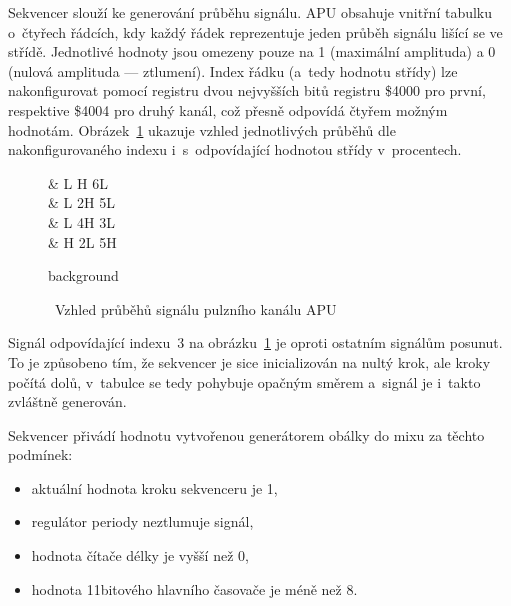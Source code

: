 Sekvencer slouží ke generování průběhu signálu. APU obsahuje vnitřní tabulku o~čtyřech řádcích, kdy každý řádek reprezentuje jeden průběh signálu lišící se ve střídě. Jednotlivé hodnoty jsou omezeny pouze na 1 (maximální amplituda) a 0 (nulová amplituda --- ztlumení). Index řádku (a~tedy hodnotu střídy) lze nakonfigurovat pomocí registru dvou nejvyšších bitů registru \$4000 pro první, respektive \$4004 pro druhý kanál, což přesně odpovídá čtyřem možným hodnotám. Obrázek~\ref{fig:apu-signaly} ukazuje vzhled jednotlivých průběhů dle nakonfigurovaného indexu i~s~odpovídající hodnotou střídy v~procentech.~\cite{Nesdev:apu-pulse}

\begin{figure}[ht!]
	\centering
	\caption{~Vzhled průběhů signálu pulzního kanálu APU}\label{fig:apu-signaly}
	\begin{tikztimingtable}[%
		timing/dslope=0.1,
		timing/.style={x=5ex,y=3ex},
		x=5ex,
		timing/rowdist=4ex,
		timing/name/.style={font=\sffamily\scriptsize}
		]
		 & L H 6L \\
		 & L 2H 5L \\
		 & L 4H 3L \\
		 & H 2L 5H \\
		\extracode
		\begin{pgfonlayer}{background}
			\begin{scope}
			\end{scope}
		\end{pgfonlayer}
	\end{tikztimingtable}
\end{figure}

\begin{note}
	Signál odpovídající indexu~3 na obrázku~\ref{fig:apu-signaly} je oproti ostatním signálům posunut. To je způsobeno tím, že sekvencer je sice inicializován na nultý krok, ale kroky počítá dolů, v~tabulce se tedy pohybuje opačným směrem a~signál je i~takto zvláštně generován.~\cite{Nesdev:apu-pulse}
\end{note}

Sekvencer přivádí hodnotu vytvořenou generátorem obálky do mixu za těchto podmínek:
\begin{itemize}
	\item aktuální hodnota kroku sekvenceru je 1,
	\item regulátor periody neztlumuje signál,
	\item hodnota čítače délky je vyšší než 0,
	\item hodnota 11bitového hlavního časovače je méně než 8.
\end{itemize}

